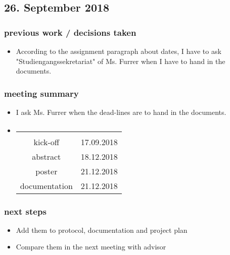 \documentclass{article}
\begin{document}
        
    
\subsection{26. September 2018}

\subsubsection{previous work / decisions taken}
\begin{itemize}
    \item According to the assignment paragraph about dates, I have to ask "Studiengangssekretariat" of Ms. Furrer when I have to hand in the documents. 
\end{itemize}

\subsubsection{meeting summary}
\begin{itemize}
    \item I ask Ms. Furrer when the dead-lines are to hand in the documents.
    \item 
    \begin{tabular}{c | c}
        \hline\\
        kick-off & 17.09.2018\\\hline
        abstract & 18.12.2018\\\hline
        poster  & 21.12.2018\\\hline
        documentation & 21.12.2018\\\hline
    \end{tabular}
\end{itemize}

\subsubsection{next steps}
\begin{itemize}
    \item Add them to protocol, documentation and project plan
    \item Compare them in the next meeting with advisor
\end{itemize}
\end{document}
